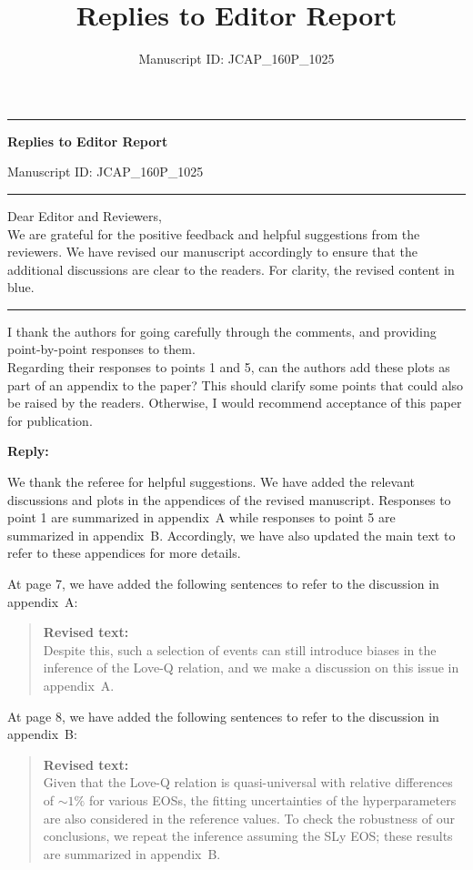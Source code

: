 \documentclass[11pt]{article}
\title{Replies to Editor Report}
\author{Manuscript ID: JCAP\_160P\_1025}
\date{}
\newenvironment{authorresponse}{
    \noindent \textbf{Reply:} \normalfont
}{
    \par\vspace{1.5em}
}
\newenvironment{revisedtext}{
    \begin{quote}
    \color{revcolor} \small \textbf{Revised text:} \\
}{
    \end{quote}
}
\begin{document}
\noindent\rule{\textwidth}{0.8pt}

\begin{center}
{\LARGE\bfseries Replies to Editor Report\par}
\vspace{0.2cm}
{Manuscript ID: JCAP\_160P\_1025\par}
\end{center}
\vspace{-0.2cm}
\noindent\rule{\textwidth}{0.8pt}

\vspace{0.2cm}
\noindent Dear Editor and Reviewers,\\

We are grateful for the positive feedback and helpful suggestions from the reviewers.
We have revised our manuscript accordingly to ensure that the additional discussions are clear to the readers.
For clarity, the {\color{revcolor} revised content} in {\color{revcolor} blue}. 

\noindent\rule{\textwidth}{0.8pt}

I thank the authors for going carefully through the comments, and providing
point-by-point responses to them. \\

Regarding their responses to points 1 and 5, can the authors add these
plots as part of an appendix to the paper? This should clarify some points
that could also be raised by the readers. Otherwise, I would recommend
acceptance of this paper for publication.

\vspace{0.3cm}

\begin{authorresponse}
We thank the referee for helpful suggestions. We have added the relevant discussions and plots in the appendices of the revised manuscript.
Responses to point 1 are summarized in appendix~A while responses to point 5 are summarized in appendix~B.
Accordingly, we have also updated the main text to refer to these appendices for more details.

At page 7, we have added the following sentences to refer to the discussion in appendix~A:
\end{authorresponse}

\begin{revisedtext}
    Despite this, such a selection of events can still introduce biases in the inference of the Love-Q relation, 
    and we make a discussion on this issue in appendix~A.
\end{revisedtext}

    At page 8, we have added the following sentences to refer to the discussion in appendix~B:

\begin{revisedtext}
    Given that the Love-Q relation is quasi-universal with relative differences of $\sim 1\%$ for various EOSs, 
    the fitting uncertainties of the hyperparameters are also considered in the reference values. 
    To check the robustness of our conclusions, we repeat the inference assuming the SLy EOS; 
    these results are summarized in appendix~B.
\end{revisedtext}
\end{document}

